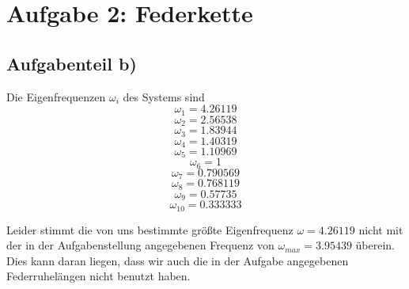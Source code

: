 \section*{Aufgabe 2: Federkette }


\subsection*{Aufgabenteil b)}

Die Eigenfrequenzen $\omega_i$ des Systems sind
$$\omega_1 = 4.26119$$
$$\omega_2 = 2.56538$$
$$\omega_3 = 1.83944$$
$$\omega_4 = 1.40319$$
$$\omega_5 = 1.10969$$
$$\omega_6 =       1$$
$$\omega_7 = 0.790569$$
$$\omega_8 = 0.768119$$
$$\omega_9 = 0.57735$$
$$\omega_{10} = 0.333333$$

Leider stimmt die von uns bestimmte größte Eigenfrequenz $\omega=4.26119$ nicht
mit der in der Aufgabenstellung angegebenen Frequenz von $\omega_{max}=3.95439$
überein. Dies kann daran liegen, dass wir auch die in der Aufgabe angegebenen
Federruhelängen nicht benutzt haben.

